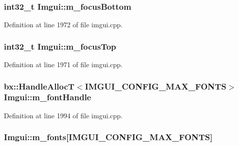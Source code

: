\hypertarget{struct_imgui_ac240b307ef0daa1811a9990eb9e2fb4e}{
\subsubsection[{m\+\_\+focus\+Bottom}]{\setlength{\rightskip}{0pt plus 5cm}int32\+\_\+t Imgui\+::m\+\_\+focus\+Bottom}}\label{struct_imgui_ac240b307ef0daa1811a9990eb9e2fb4e}


Definition at line 1972 of file imgui.\+cpp.

\hypertarget{struct_imgui_a5b80f664bae3b24856f1e6f7ee997689}{
\subsubsection[{m\+\_\+focus\+Top}]{\setlength{\rightskip}{0pt plus 5cm}int32\+\_\+t Imgui\+::m\+\_\+focus\+Top}}\label{struct_imgui_a5b80f664bae3b24856f1e6f7ee997689}


Definition at line 1971 of file imgui.\+cpp.

\hypertarget{struct_imgui_a5e2a8ede1963b850515781425f730373}{
\subsubsection[{m\+\_\+font\+Handle}]{\setlength{\rightskip}{0pt plus 5cm}bx\+::\+Handle\+Alloc\+T$<${\bf I\+M\+G\+U\+I\+\_\+\+C\+O\+N\+F\+I\+G\+\_\+\+M\+A\+X\+\_\+\+F\+O\+N\+T\+S}$>$ Imgui\+::m\+\_\+font\+Handle}}\label{struct_imgui_a5e2a8ede1963b850515781425f730373}


Definition at line 1994 of file imgui.\+cpp.

\hypertarget{struct_imgui_ac6afbf99733c4ae9446120bd13549b51}{
\subsubsection[{m\+\_\+fonts}]{ Imgui\+::m\+\_\+fonts\mbox{[}{\bf I\+M\+G\+U\+I\+\_\+\+C\+O\+N\+F\+I\+G\+\_\+\+M\+A\+X\+\_\+\+F\+O\+N\+T\+S}\mbox{]}}}\label{struct_imgui_ac6afbf99733c4ae9446120bd13549b51}


